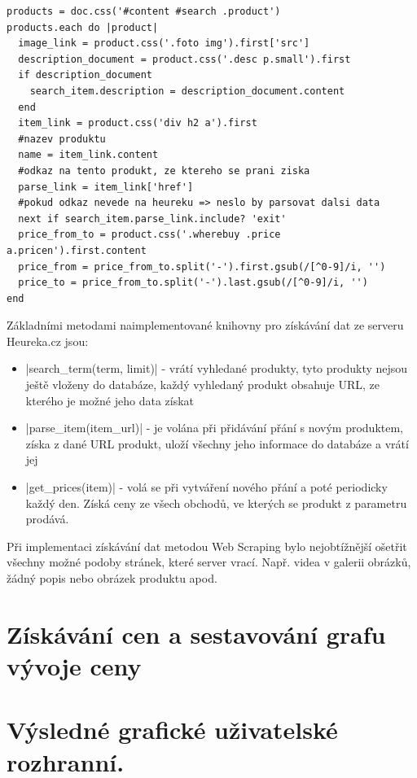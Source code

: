 \begin{lstlisting}
products = doc.css('#content #search .product')
products.each do |product|
  image_link = product.css('.foto img').first['src']
  description_document = product.css('.desc p.small').first
  if description_document
    search_item.description = description_document.content
  end
  item_link = product.css('div h2 a').first
  #nazev produktu
  name = item_link.content
  #odkaz na tento produkt, ze ktereho se prani ziska
  parse_link = item_link['href']
  #pokud odkaz nevede na heureku => neslo by parsovat dalsi data
  next if search_item.parse_link.include? 'exit'
  price_from_to = product.css('.wherebuy .price a.pricen').first.content
  price_from = price_from_to.split('-').first.gsub(/[^0-9]/i, '')
  price_to = price_from_to.split('-').last.gsub(/[^0-9]/i, '')
end
\end{lstlisting}

Základními metodami naimplementované knihovny pro získávání dat ze serveru Heureka.cz jsou:

\begin{itemize}
\item |search_term(term, limit)| - vrátí vyhledané produkty, tyto produkty nejsou ještě vloženy do databáze, každý vyhledaný produkt obsahuje URL, ze kterého je možné jeho data získat
\item |parse_item(item_url)| - je volána při přidávání přání s novým produktem, získa z dané URL produkt, uloží všechny jeho informace do databáze a vrátí jej
\item |get_prices(item)| - volá se při vytváření nového přání a poté periodicky každý den. Získá ceny ze všech obchodů, ve kterých se produkt z parametru prodává.
\end{itemize}

Při implementaci získávání dat metodou Web Scraping bylo nejobtížnější ošetřit všechny možné podoby stránek, které server vrací. Např. videa v galerii obrázků, žádný popis nebo obrázek produktu apod.

\section{Získávání cen a sestavování grafu vývoje ceny}

\section{Výsledné grafické uživatelské rozhranní.}
